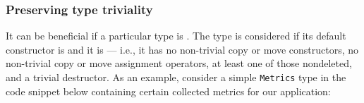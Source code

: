 %
%
%
%
%
%
%
%
%
%
%
%
%


\subsubsection{Preserving type triviality}

It can be beneficial if a particular type is .  The type is considered  if its default constructor is  and it is  --- i.e., it has no non-trivial copy or move constructors, no non-trivial copy or move assignment operators, at least one of those nondeleted, and a trivial destructor.  As an example, consider a simple   \lstinline!Metrics! type in the code snippet below containing certain collected metrics for our application:

